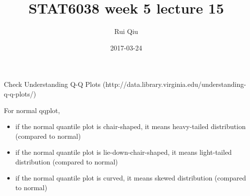 \documentclass[a4paper, 11pt, twoside]{article}
\begin{document}
\title{STAT6038 week 5 lecture 15}
\author{Rui Qiu}
\date{2017-03-24}

\maketitle

Check Understanding Q-Q Plots (http://data.library.virginia.edu/understanding-q-q-plots/)

For normal qqplot,

\begin{itemize}
	\item if the normal quantile plot is chair-shaped, it means heavy-tailed distribution (compared to normal)
	\item if the normal quantile plot is lie-down-chair-shaped, it means light-tailed distribution (compared to normal)
	\item if the normal quantile plot is curved, it means skewed distribution (compared to normal)
\end{itemize}
\end{document}

